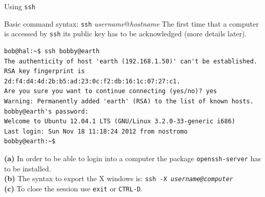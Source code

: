 \begin{frame}[t,fragile]{Using \alert{\texttt{ssh}}}


  \begin{block}{Basic command syntax: \alert{\texttt{ssh} \emph{username}@\emph{hostname}}}
    {\footnotesize The first time that a computer is accessed by \texttt{ssh} its public key has to be acknowledged (more details later).}
{\scriptsize
  \begin{lstlisting}
bob@hal:~$ ssh bobby@earth
The authenticity of host 'earth (192.168.1.50)' can't be established.
RSA key fingerprint is 2d:f4:d4:4d:2b:b5:ad:23:0c:f2:db:16:1c:07:27:c1.
Are you sure you want to continue connecting (yes/no)? yes 
Warning: Permanently added 'earth' (RSA) to the list of known hosts.
bobby@earth's password: 
Welcome to Ubuntu 12.04.1 LTS (GNU/Linux 3.2.0-33-generic i686)
Last login: Sun Nov 18 11:18:24 2012 from nostromo
bobby@earth:~$ 
  \end{lstlisting}
}

{\footnotesize\textbf{(a)} In order to be able to login into a computer the package \texttt{openssh-server} has to be installed.\\
\textbf{(b)} The syntax to export the X windows is: 
\texttt{\alert{ssh -X} \emph{\alert{username@computer}}}\\
\textbf{(c)} To close the session use  \texttt{\alert{exit}} or \texttt{CTRL-D}.
}
  \end{block}
  
\end{frame}
